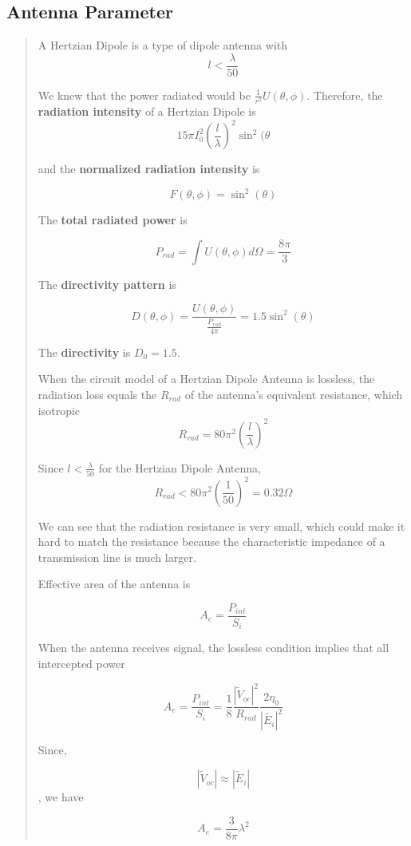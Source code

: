 \documentclass{article} %
\begin{document}
\subsection{Antenna Parameter}
\begin{quote}
    A Hertzian Dipole is a type of dipole antenna with
    \[l < \frac{\lambda}{50} \]

    We knew that the power radiated would be $\frac{1}{r^2} U(\theta, \phi)$. Therefore, the \textbf{radiation intensity} of a Hertzian Dipole is
    \[15 \pi I_0 ^2\left(\frac{l}{\lambda}\right)^2 \sin^2(\theta\]

    and the \textbf{normalized radiation intensity} is

    \[F(\theta, \phi) = \sin^2(\theta)\]

    The \textbf{total radiated power} is

    \[P_{rad} = \int U(\theta, \phi) d\Omega = \frac{8 \pi}{3}\]

    The \textbf{directivity pattern} is

    \[D(\theta,\phi) = \frac{U(\theta, \phi)}{\frac{P_{rad}}{4 \pi}} = 1.5 \sin^2(\theta)\]

    The \textbf{directivity} is $D_0 = 1.5$.

    When the circuit model of a Hertzian Dipole Antenna is lossless, the radiation loss equals the $R_{rad}$ of the antenna's equivalent resistance, which isotropic
    \[R_{rad} = 80 \pi^2 \left(\frac{l}{\lambda}\right)^2\]

    Since $l < \frac{\lambda}{50}$ for the Hertzian Dipole Antenna,
    \[R_{rad} < 80 \pi^2 \left(\frac{1}{50}\right)^2 = 0.32 \Omega\]

    We can see that the radiation resistance is very small, which could make it hard to match the resistance because the characteristic impedance of a transmission line is much larger.

    Effective area of the antenna is

    \[A_e = \frac{P_{int}}{S_i}\]

    When the antenna receives signal, the lossless condition implies that all intercepted power

    \[A_e = \frac{P_{int}}{S_i} = \frac{1}{8}\frac{|\tilde{V}_{oc}|^2}{R_{rad}} \frac{2 \eta_0}{|\tilde{E_i}|^2}\]

    Since,

    \[|\tilde{V}_{oc} | \approx | \tilde{E}_i|\], we have

    \[A_e = \frac{3}{8 \pi} \lambda^2\]


\end{quote}
\end{document}
